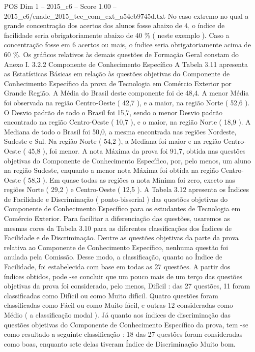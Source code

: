 \begin{textsample}{POS Dim 1 – 2015\_c6 – Score 1.00 – 2015\_c6/enade\_2015\_tec\_com\_ext\_a54eb9745d.txt}
No caso extremo no qual a grande concentração dos acertos dos alunos fosse abaixo de 4, o índice de facilidade seria obrigatoriamente abaixo de 40 \% ( neste exemplo ).
Caso a concentração fosse em 6 acertos ou mais, o índice seria obrigatoriamente acima de 60 \%.
Os gráficos relativos às demais questões de Formação Geral constam do Anexo I. 3.2.2 Componente de Conhecimento Específico A Tabela 3.11 apresenta as Estatísticas Básicas em relação às questões objetivas do Componente de Conhecimento Específico da prova de Tecnologia em Comércio Exterior por Grande Região.
A Média do Brasil deste componente foi de 48,4.
A menor Média foi observada na região Centro-Oeste ( 42,7 ), e a maior, na região Norte ( 52,6 ).
O Desvio padrão de todo o Brasil foi 15,7, sendo o menor Desvio padrão encontrado na região Centro-Oeste ( 10,7 ), e o maior, na região Norte ( 18,9 ).
A Mediana de todo o Brasil foi 50,0, a mesma encontrada nas regiões Nordeste, Sudeste e Sul.
Na região Norte ( 54,2 ), a Mediana foi maior e na região Centro-Oeste ( 45,8 ), foi menor.
A nota Máxima da prova foi 91,7, obtida nas questões objetivas do Componente de Conhecimento Específico, por, pelo menos, um aluno na região Sudeste, enquanto a menor nota Máxima foi obtida na região Centro-Oeste ( 58,3 ).
Em quase todas as regiões a nota Mínima foi zero, exceto nas regiões Norte ( 29,2 ) e Centro-Oeste ( 12,5 ).
A Tabela 3.12 apresenta os Índices de Facilidade e Discriminação ( ponto-bisserial ) das questões objetivas do Componente de Conhecimento Específico para os estudantes de Tecnologia em Comércio Exterior.
Para facilitar a diferenciação das questões, usaremos as mesmas cores da Tabela 3.10 para as diferentes classificações dos Índices de Facilidade e de Discriminação.
Dentre as questões objetivas da parte da prova relativa ao Componente de Conhecimento Específico, nenhuma questão foi anulada pela Comissão.
Desse modo, a classificação, quanto ao Índice de Facilidade, foi estabelecida com base em todas as 27 questões.
A partir dos índices obtidos, pode -se concluir que um pouco mais de um terço das questões objetivas da prova foi considerado, pelo menos, Difícil : das 27 questões, 11 foram classificadas como Difícil ou como Muito difícil.
Quatro questões foram classificadas como Fácil ou como Muito fácil, e outras 12 consideradas como Médio ( a classificação modal ).
Já quanto aos índices de discriminação das questões objetivas do Componente de Conhecimento Específico da prova, tem -se como resultado a seguinte classificação : 18 das 27 questões foram consideradas como boas, enquanto sete delas tiveram Índice de Discriminação Muito bom.

\end{textsample}
